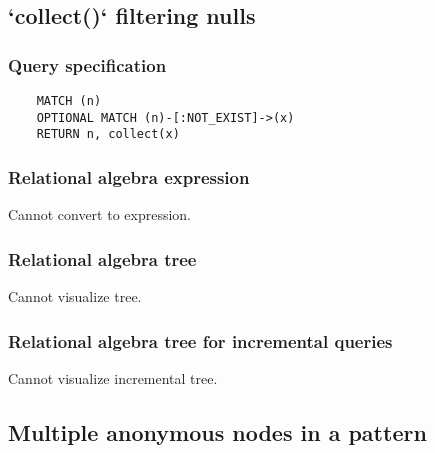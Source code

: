 	\subsection{`collect()` filtering nulls}

	\subsubsection*{Query specification}

	\begin{lstlisting}
	MATCH (n)
	OPTIONAL MATCH (n)-[:NOT_EXIST]->(x)
	RETURN n, collect(x)
	\end{lstlisting}


	\subsubsection*{Relational algebra expression}

	Cannot convert to expression.

	\subsubsection*{Relational algebra tree}

	Cannot visualize tree.

	\subsubsection*{Relational algebra tree for incremental queries}

	Cannot visualize incremental tree.
	\subsection{Multiple anonymous nodes in a pattern}

